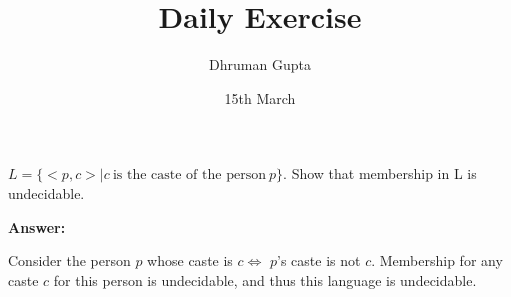 \documentclass[11pt]{article}
\title{Daily Exercise}
\author{Dhruman Gupta}
\date{15th March}
\begin{document}

$L = \{<p,c> | c\ \text{is the caste of the person}\ p\}$. Show that membership in L is undecidable.

\textbf{Answer:}

Consider the person $p$ whose caste is $c \iff$ $p$'s caste is not $c$. Membership for any caste $c$ for this person is undecidable, and thus this language is undecidable.
\end{document}
